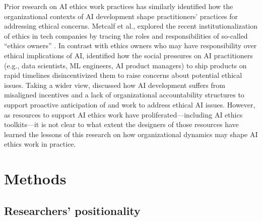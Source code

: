 \documentclass[acmsmall]{acmart}
\begin{document}
Prior research on AI ethics work practices has similarly identified how the organizational contexts of AI development shape practitioners' practices for addressing ethical concerns. Metcalf et al., explored the recent institutionalization of ethics in tech companies by tracing the roles and responsibilities of so-called ``ethics owners'' \cite{Metcalf2019OwningEthics}. In contrast with ethics owners who may have responsibility over ethical implications of AI, \citet{madaio2020co} identified how the social pressures on AI practitioners (e.g., data scientists, ML engineers, AI product managers) to ship products on rapid timelines disincentivized them to raise concerns about potential ethical issues. Taking a wider view, \citet{rakova2021responsible} discussed how AI development suffers from misaligned incentives and a lack of organizational accountability structures to support proactive anticipation of and work to address ethical AI issues. However, as resources to support AI ethics work have proliferated---including AI ethics toolkits---it is not clear to what extent the designers of those resources have learned the lessons of this research on how organizational dynamics may shape AI ethics work in practice.

\section{Methods}
\subsection{Researchers' positionality}
\end{document}
